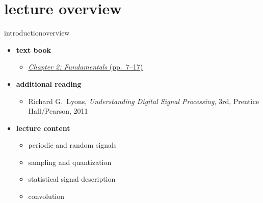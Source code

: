 

\subtitle{Part 3.1: Fundamentals I}


	

    \section[overview]{lecture overview}
        \begin{frame}{introduction}{overview}
            \begin{itemize}
                \item   \textbf{text book}  
                    \begin{itemize}
                        \item   \href{http://ieeexplore.ieee.org/xpl/ebooks/bookPdfWithBanner.jsp?fileName=6331119.pdf&bkn=6266785&pdfType=chapter}{\underline{\textit{Chapter 2: Fundamentals} (pp.~7--17)}}
                    \end{itemize}
                \item   \textbf{additional reading}  
                    \begin{itemize}
                        \item   Richard G.~Lyons, \textit{Understanding Digital Signal Processing}, 3rd, Prentice Hall/Pearson, 2011
                    \end{itemize}
                \bigskip
                \item<2->   \textbf{lecture content}
                    \begin{itemize}
                        \item<2->   periodic and random signals
                        \item<3->   sampling and quantization
                        \item<4->   statistical signal description
                        \item<5->   convolution
                    \end{itemize}
            \end{itemize}
        \end{frame}
        
